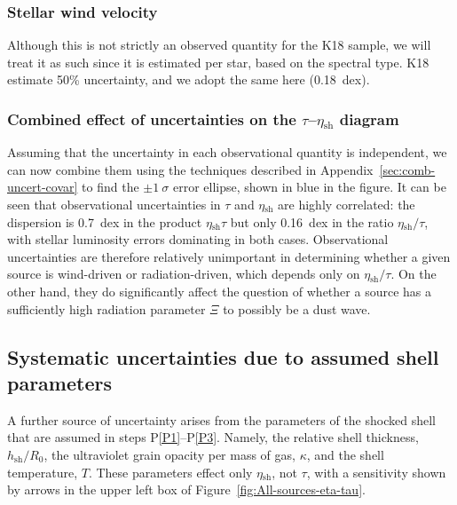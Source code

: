 \documentclass[useAMS, usenatbib, a4paper]{mnras}
\newcommand\shell{\ensuremath{_{\text{sh}}}}
\begin{document}
\subsubsection{Stellar wind velocity}
\label{sec:stell-wind-veloc}

Although this is not strictly an observed quantity for the K18 sample,
we will treat it as such since it is estimated per star, based on the
spectral type.  K18 estimate 50\% uncertainty, and we adopt the same
here (0.18~dex).


\subsubsection{Combined effect of uncertainties on the
  \(\tau\)--\(\eta\shell\) diagram}
\label{sec:comb-effect-uncert}

Assuming that the uncertainty in each observational quantity is
independent, we can now combine them using the techniques described in
Appendix~\ref{sec:comb-uncert-covar} to find the \(\pm 1~\sigma\) error
ellipse, shown in blue in the figure.  It can be seen that
observational uncertainties in \(\tau\) and \(\eta\shell\) are highly
correlated: the dispersion is \SI{0.7}{dex} in the product
\(\eta\shell \tau\) but only \SI{0.16}{dex} in the ratio
\(\eta\shell/\tau\), with stellar luminosity errors dominating in both
cases.  Observational uncertainties are therefore relatively
unimportant in determining whether a given source is wind-driven or
radiation-driven, which depends only on \(\eta\shell/\tau\).  On the other
hand, they do significantly affect the question of whether a source
has a sufficiently high radiation parameter \(\Xi\) to possibly be a
dust wave.


\subsection{Systematic uncertainties due to assumed shell parameters}
\label{sec:syst-uncert-due}

A further source of uncertainty arises from the parameters of the
shocked shell that are assumed in steps P\ref{P1}--P\ref{P3}. Namely,
the relative shell thickness, \(h\shell/R_0\), the ultraviolet grain
opacity per mass of gas, \(\kappa\), and the shell temperature, \(T\).
These parameters effect only \(\eta\shell\), not \(\tau\), with a
sensitivity shown by arrows in the upper left box of
Figure~\ref{fig:All-sources-eta-tau}.
\end{document}
